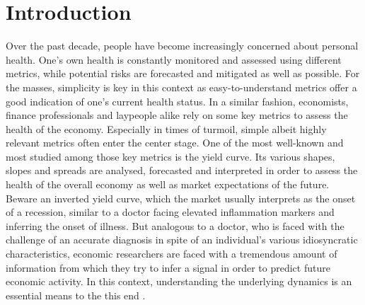 \section{Introduction}
\label{sec:intro}

Over the past decade, people have become increasingly concerned about personal health. 
One's own health is constantly monitored and assessed using different metrics, while potential risks are forecasted and mitigated as well as possible. 
For the masses, simplicity is key in this context as easy-to-understand metrics offer a good indication of one’s current health status. 
In a similar fashion, economists, finance professionals and laypeople alike rely on some key metrics to assess the health of the economy. 
Especially in times of turmoil, simple albeit highly relevant metrics often enter the center stage. 
One of the most well-known and most studied among those key metrics is the yield curve. 
Its various shapes, slopes and spreads are analysed, forecasted and interpreted in order to assess the health of the overall economy as well as market expectations of the future.
Beware an inverted yield curve, which the market usually interprets as the onset of a recession, similar to a doctor facing elevated inflammation markers and inferring the onset of illness. 
But analogous to a doctor, who is faced with the challenge of an accurate diagnosis in spite of an individual's various idiosyncratic characteristics, economic researchers are faced with a tremendous amount of information from which they try to infer a signal in order to predict future economic activity. 
In this context, understanding the underlying dynamics is an essential means to the this end .

